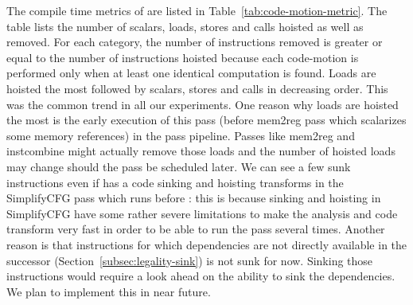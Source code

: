 \documentclass[acmlarge,review,anonymous]{acmart}\settopmatter{printfolios=true}
\begin{document}
The compile time metrics of \GCM{} are listed in
Table~\ref{tab:code-motion-metric}. The table lists the number of scalars,
loads, stores and calls hoisted as well as removed. For each category, the
number of instructions removed is greater or equal to the number of instructions
hoisted because each code-motion is performed only when at least one identical
computation is found. Loads are hoisted the most followed by scalars, stores and
calls in decreasing order.  This was the common trend in all our
experiments. One reason why loads are hoisted the most is the early execution of
this pass (before mem2reg pass which scalarizes some memory references) in the
\LLVM{} pass pipeline. Passes like mem2reg and instcombine might actually remove
those loads and the number of hoisted loads may change should the \GCM{} pass be
scheduled later. We can see a few sunk instructions even if \LLVM{} has a code
sinking and hoisting transforms in the SimplifyCFG pass which runs before
\GCM{}: this is because sinking and hoisting in SimplifyCFG have some rather
severe limitations to make the analysis and code transform very fast in order to
be able to run the pass several times.  Another reason is that instructions for
which dependencies are not directly available in the successor
(Section~\ref{subsec:legality-sink}) is not sunk for now. Sinking those
instructions would require a look ahead on the ability to sink the
dependencies. We plan to implement this in near future.
\end{document}
